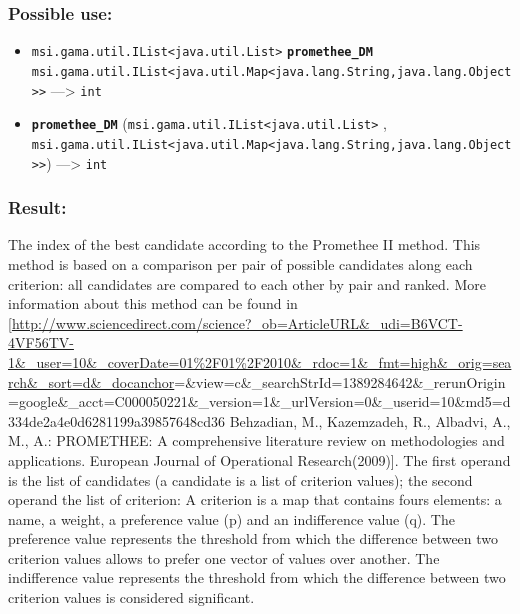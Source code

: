 \documentclass[]{book}
\providecommand{\tightlist}{%
  \setlength{\itemsep}{0pt}\setlength{\parskip}{0pt}}
\theoremstyle{definition}
\theoremstyle{definition}
\theoremstyle{definition}
\theoremstyle{remark}
\begin{document}
\subsubsection{Possible use:}\label{possible-use-419}

\begin{itemize}
\tightlist
\item
  \texttt{msi.gama.util.IList\textless{}java.util.List\textgreater{}}
  \textbf{\texttt{promethee\_DM}}
  \texttt{msi.gama.util.IList\textless{}java.util.Map\textless{}java.lang.String,java.lang.Object\textgreater{}\textgreater{}}
  ---\textgreater{} \texttt{int}
\item
  \textbf{\texttt{promethee\_DM}}
  (\texttt{msi.gama.util.IList\textless{}java.util.List\textgreater{}} ,
  \texttt{msi.gama.util.IList\textless{}java.util.Map\textless{}java.lang.String,java.lang.Object\textgreater{}\textgreater{}})
  ---\textgreater{} \texttt{int}
\end{itemize}

\subsubsection{Result:}\label{result-405}

The index of the best candidate according to the Promethee II method.
This method is based on a comparison per pair of possible candidates
along each criterion: all candidates are compared to each other by pair
and ranked. More information about this method can be found in
{[}\url{http://www.sciencedirect.com/science?_ob=ArticleURL\&_udi=B6VCT-4VF56TV-1\&_user=10\&_coverDate=01\%2F01\%2F2010\&_rdoc=1\&_fmt=high\&_orig=search\&_sort=d\&_docanchor}=\&view=c\&\_searchStrId=1389284642\&\_rerunOrigin=google\&\_acct=C000050221\&\_version=1\&\_urlVersion=0\&\_userid=10\&md5=d334de2a4e0d6281199a39857648cd36
Behzadian, M., Kazemzadeh, R., Albadvi, A., M., A.: PROMETHEE: A
comprehensive literature review on methodologies and applications.
European Journal of Operational Research(2009){]}. The first operand is
the list of candidates (a candidate is a list of criterion values); the
second operand the list of criterion: A criterion is a map that contains
fours elements: a name, a weight, a preference value (p) and an
indifference value (q). The preference value represents the threshold
from which the difference between two criterion values allows to prefer
one vector of values over another. The indifference value represents the
threshold from which the difference between two criterion values is
considered significant.
\end{document}
